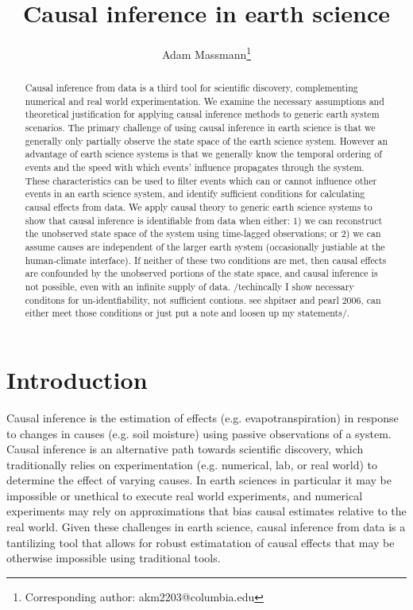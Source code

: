 \documentclass[12pt]{article}
\begin{document}
\title{Causal inference in earth science}

\author{Adam Massmann\thanks{Corresponding author: akm2203@columbia.edu}}

\maketitle

\begin{abstract}
  Causal inference from data is a third tool for scientific discovery,
  complementing numerical and real world experimentation. We examine
  the necessary assumptions and theoretical justification for applying
  causal inference methods to generic earth system scenarios. The
  primary challenge of using causal inference in earth science is that
  we generally only partially observe the state space of the earth
  science system. However an advantage of earth science systems is
  that we generally know the temporal ordering of events and the speed
  with which events' influence propagates through the system. These
  characteristics can be used to filter events which can or cannot
  influence other events in an earth science system, and identify
  sufficient conditions for calculating causal effects from data. We
  apply causal theory to generic earth science systems to show that
  causal inference is identifiable from data when either: 1) we can
  reconstruct the unobserved state space of the system using
  time-lagged observations; or 2) we can assume causes are independent
  of the larger earth system (occasionally justiable at the
  human-climate interface). If neither of these two conditions are
  met, then causal effects are confounded by the unobserved portions
  of the state space, and causal inference is not possible, even with
  an infinite supply of data. /techincally I show necessary conditons
  for un-identfiability, not sufficient contions. see shpitser and
  pearl 2006, can either meet those conditions or just put a note and
  loosen up my statements/.
\end{abstract}

\section{Introduction}


Causal inference is the estimation of effects
(e.g. evapotranspiration) in response to changes in causes (e.g. soil
moisture) using passive observations of a system. Causal inference is
an alternative path towards scientific discovery, which traditionally
relies on experimentation (e.g. numerical, lab, or real world) to
determine the effect of varying causes. In earth sciences in
particular it may be impossible or unethical to execute real world
experiments, and numerical experiments may rely on approximations that
bias causal estimates relative to the real world. Given these
challenges in earth science, causal inference from data is a
tantilizing tool that allows for robust estimatation of causal effects
that may be otherwise impossible using traditional tools.
\end{document}
